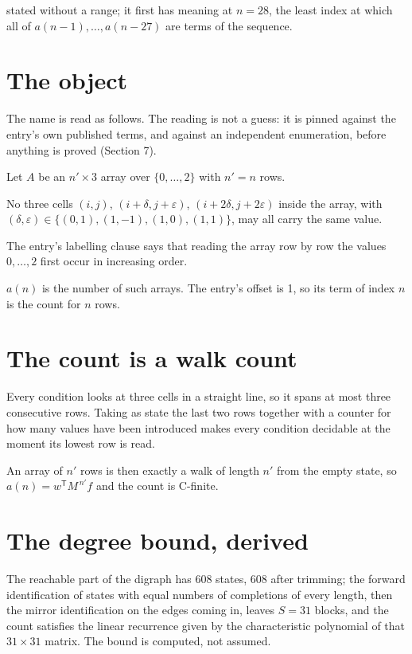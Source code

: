 \documentclass[11pt]{article}
\theoremstyle{definition}
\begin{document}
stated without a range; it first has meaning at $n = 28$, the least index at which all of $a(n-1),\dots,a(n-27)$ are terms of the sequence.

\section{The object}

The name is read as follows. The reading is not a guess: it is pinned against the entry's own published terms, and against an independent enumeration, before anything is proved (Section 7).

Let $A$ be an $n' \times 3$ array over $\{0,\dots,2\}$ with $n' = n$ rows.

No three cells $(i,j)$, $(i{+}\delta,j{+}\varepsilon)$, $(i{+}2\delta,j{+}2\varepsilon)$ inside the array, with $(\delta,\varepsilon) \in \{(0,1), (1,-1), (1,0), (1,1)\}$, may all carry the same value.

The entry's labelling clause says that reading the array row by row the values $0,\dots,2$ first occur in increasing order.

$a(n)$ is the number of such arrays. The entry's offset is 1, so its term of index $n$ is the count for $n$ rows.

\section{The count is a walk count}

Every condition looks at three cells in a straight line, so it spans at most three consecutive rows. Taking as state the last two rows together with a counter for how many values have been introduced makes every condition decidable at the moment its lowest row is read.

An array of $n'$ rows is then exactly a walk of length $n'$ from the empty state, so $a(n) = w^{\mathsf T}M^{\,n'}f$ and the count is C-finite.

\section{The degree bound, derived}

The reachable part of the digraph has $608$ states, $608$ after trimming; the forward identification of states with equal numbers of completions of every length, then the mirror identification on the edges coming in, leaves $S = 31$ blocks, and the count satisfies the linear recurrence given by the characteristic polynomial of that $31\times31$ matrix. The bound is computed, not assumed.
\end{document}
